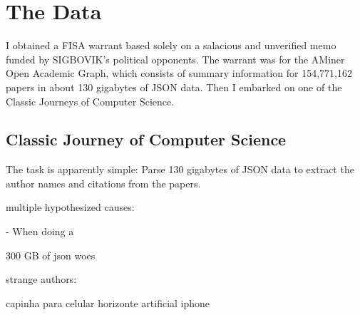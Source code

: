 \documentclass[twocolumn]{article}
\begin{document}
\section{The Data}

I obtained a FISA warrant based solely on a salacious and unverified
memo funded by SIGBOVIK's political opponents. The warrant was for the
AMiner Open Academic Graph, which consists of summary information for
154,771,162 papers in about 130 gigabytes of JSON data. Then I embarked
on one of the Classic Journeys of Computer Science.

\subsection{Classic Journey of Computer Science}

The task is apparently simple: Parse 130 gigabytes of JSON data to
extract the author names and citations from the papers. 


multiple hypothesized causes:

 - When doing a 


300 GB of json woes
 

strange authors:

capinha para celular horizonte artificial iphone
\end{document}
